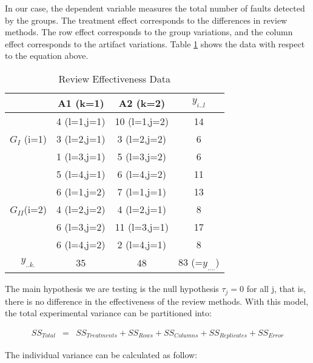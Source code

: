 In our case, the dependent variable measures the total number of
faults detected by the groups. The treatment effect corresponds to the
differences in review methods. The row effect corresponds to the
group variations, and the column effect corresponds to the
artifact variations.
Table \ref{effectiveness} shows the data with respect to the equation
above. 

\begin{table}[h]
\begin{center}
\begin{tabular}{|c|c|c|c|}
\hline
          & A1 (k=1)     & A2 (k=2) & $y_{i..l}$ \\
\hline                  
          & 4 (l=1,j=1)  & 10 (l=1,j=2) & 14 \\
$G_I$ (i=1) & 3 (l=2,j=1)  & 3 (l=2,j=2) & 6 \\
          & 1 (l=3,j=1)  & 5 (l=3,j=2) & 6\\
          & 5 (l=4,j=1)  & 6 (l=4,j=2) & 11\\
\hline                  
          & 6 (l=1,j=2)  & 7 (l=1,j=1) & 13\\
$G_{II}$(i=2) & 4 (l=2,j=2)  & 4 (l=2,j=1) & 8\\
           & 6 (l=3,j=2)  & 11 (l=3,j=1) & 17\\
          & 6 (l=4,j=2)  & 2 (l=4,j=1) & 8\\
\hline
$y_{..k.}$ & 35          & 48          & 83 (=$y_{....}$) \\
\hline
\end{tabular}
\end{center}
\caption{Review Effectiveness Data}
\label{effectiveness}
\end{table}


The main hypothesis we are testing is the null hypothesis $\tau_j=0$
for all j, that is, there is no difference in the effectiveness of the
review methods.
With this model, the total experimental variance can be partitioned into:

\begin{eqnarray*}
SS_{Total} & = & SS_{Treatments}+SS_{Rows}+SS_{Columns}+SS_{Replicates}+SS_{Error}
\end{eqnarray*}

The individual variance can be calculated as follow:

